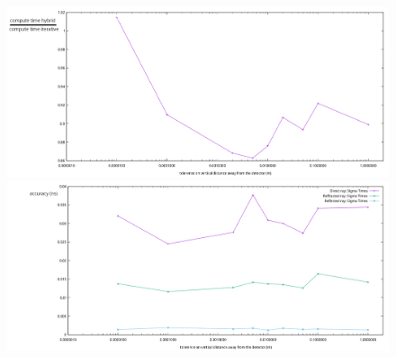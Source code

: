 \documentclass{beamer}
\begin{document}
\begin{frame}
	\begin{figure}
		\begin{minipage}{\textwidth}
			\centering
			\includegraphics[height=0.45\textheight]{figures/ZtolVsTime2.pdf}
		\end{minipage}
		\begin{minipage}{\textwidth}
			\centering
			\includegraphics[height=0.45\textheight]{figures/ZtolVsSigmaTime.pdf}
		\end{minipage}
	\end{figure}
\end{frame}
\end{document}
